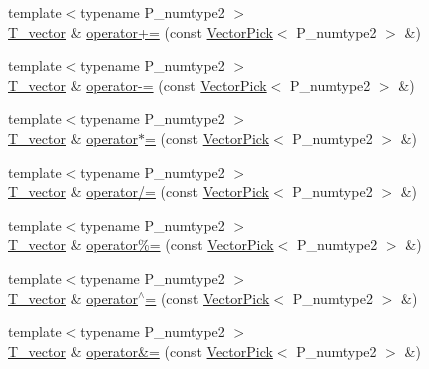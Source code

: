 \begin{DoxyCompactItemize}
{\footnotesize template$<$typename P\+\_\+numtype2 $>$ }\\\hyperlink{classTinyVector_aea08e4463006acf6842a93c026b27094}{T\+\_\+vector} \& \hyperlink{classTinyVector_a70c262011ffc2a59f8f7b2f22bd26a73}{operator+=} (const \hyperlink{classVectorPick}{Vector\+Pick}$<$ P\+\_\+numtype2 $>$ \&)
\item 
{\footnotesize template$<$typename P\+\_\+numtype2 $>$ }\\\hyperlink{classTinyVector_aea08e4463006acf6842a93c026b27094}{T\+\_\+vector} \& \hyperlink{classTinyVector_a7a3d8ff575f4c783c5deacd09d9c3077}{operator-\/=} (const \hyperlink{classVectorPick}{Vector\+Pick}$<$ P\+\_\+numtype2 $>$ \&)
\item 
{\footnotesize template$<$typename P\+\_\+numtype2 $>$ }\\\hyperlink{classTinyVector_aea08e4463006acf6842a93c026b27094}{T\+\_\+vector} \& \hyperlink{classTinyVector_a146afe5f7d29db3d881b08fd83a89561}{operator$\ast$=} (const \hyperlink{classVectorPick}{Vector\+Pick}$<$ P\+\_\+numtype2 $>$ \&)
\item 
{\footnotesize template$<$typename P\+\_\+numtype2 $>$ }\\\hyperlink{classTinyVector_aea08e4463006acf6842a93c026b27094}{T\+\_\+vector} \& \hyperlink{classTinyVector_aa57868d917ae585cd19cb4e87deaa5e9}{operator/=} (const \hyperlink{classVectorPick}{Vector\+Pick}$<$ P\+\_\+numtype2 $>$ \&)
\item 
{\footnotesize template$<$typename P\+\_\+numtype2 $>$ }\\\hyperlink{classTinyVector_aea08e4463006acf6842a93c026b27094}{T\+\_\+vector} \& \hyperlink{classTinyVector_a1076035c6422bffbf488a6fa208f8575}{operator\%=} (const \hyperlink{classVectorPick}{Vector\+Pick}$<$ P\+\_\+numtype2 $>$ \&)
\item 
{\footnotesize template$<$typename P\+\_\+numtype2 $>$ }\\\hyperlink{classTinyVector_aea08e4463006acf6842a93c026b27094}{T\+\_\+vector} \& \hyperlink{classTinyVector_a79d46a89609cc5eefcdbde7f7875dd68}{operator$^\wedge$=} (const \hyperlink{classVectorPick}{Vector\+Pick}$<$ P\+\_\+numtype2 $>$ \&)
\item 
{\footnotesize template$<$typename P\+\_\+numtype2 $>$ }\\\hyperlink{classTinyVector_aea08e4463006acf6842a93c026b27094}{T\+\_\+vector} \& \hyperlink{classTinyVector_a25ba3b81be9e7e4c0b4a08e32b0a1b21}{operator\&=} (const \hyperlink{classVectorPick}{Vector\+Pick}$<$ P\+\_\+numtype2 $>$ \&)
\item 

\end{DoxyCompactItemize}
